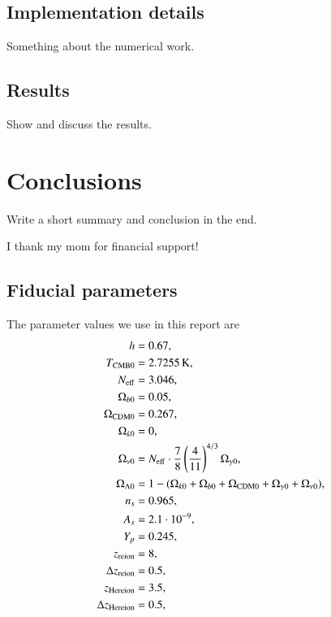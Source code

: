 \documentclass{aa}
\begin{document}
\subsection{Implementation details}
Something about the numerical work.

\subsection{Results}
Show and discuss the results.

\section{Conclusions}

Write a short summary and conclusion in the end. 

\begin{acknowledgements}
      I thank my mom for financial support!
\end{acknowledgements}


\clearpage
% 

% 

% 

\begin{appendix}
\section{Fiducial parameters} \label{app:M1:fiducial_parameters}
The parameter values we use in this report are 
\begin{equation} \label{eq:Appendix:Fiducial_cosmology_parameters}
      \begin{split}
            h &= 0.67, \\ 
            T_\mathrm{CMB0} &= 2.7255\,\mathrm{K}, \\
            N_\mathrm{eff} &= 3.046, \\
            \Omega_{b0} &= 0.05, \\
            \Omega_\mathrm{CDM0} &= 0.267,\\
            \Omega_{k0} &=0,\\
            \Omega_{\nu 0} &= N_\mathrm{eff} \cdot \frac{7}{8} \left( \frac{4}{11} \right)^{4/3} \Omega_{\gamma 0}, \\
            \Omega_{\Lambda 0} &= 1 - (\Omega_{k0} + \Omega_{b0} + \Omega_\mathrm{CDM0} + \Omega_{\gamma 0} + \Omega_{\nu 0}), \\
            n_s &= 0.965,\\
            A_s &= 2.1\cdot 10^{-9},\\
            Y_p &= 0.245, \\
            z_\mathrm{reion} &= 8, \\
            \Delta z_\mathrm{reion} &= 0.5, \\
            z_\mathrm{Hereion} &= 3.5, \\
            \Delta z_\mathrm{Hereion} &= 0.5, \\
      \end{split}
\end{equation}


\end{appendix}
\end{document}
